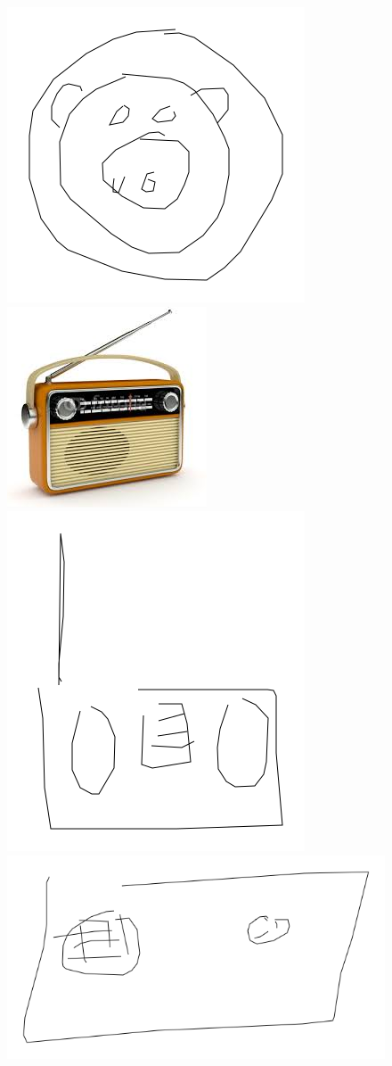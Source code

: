 \documentclass{article}
\begin{document}
\begin{figure}[h]
\includegraphics[scale=0.15]{images/pig00295.png}\\
\includegraphics[scale=0.2]{images/radio.jpg}
\includegraphics[scale=0.1]{images/radio00008.png}
\includegraphics[scale=0.1]{images/radio00111.png}

\end{figure}
\end{document}
